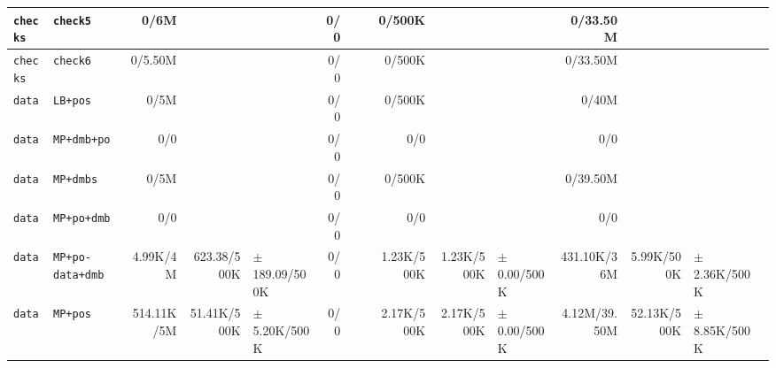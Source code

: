 \begin{tabular}{l l  | r r l | r r l | r r l | r r l l}
         \verb|checks| &                                              \verb|check5| &           0/6M &                       &                   &            0/0 &                       &  &         0/500K &                       &                   &       0/33.50M &                       &                   & \\ \hline 
         \verb|checks| &                                              \verb|check6| &        0/5.50M &                       &                   &            0/0 &                       &  &         0/500K &                       &                   &       0/33.50M &                       &                   & \\ \hline 
           \verb|data| &                                              \verb|LB+pos| &           0/5M &                       &                   &            0/0 &                       &  &         0/500K &                       &                   &          0/40M &                       &                   & \\ \hline 
           \verb|data| &                                           \verb|MP+dmb+po| &            0/0 &                       &                   &            0/0 &                       &  &            0/0 &                       &                   &            0/0 &                       &                   & \\ \hline 
           \verb|data| &                                             \verb|MP+dmbs| &           0/5M &                       &                   &            0/0 &                       &  &         0/500K &                       &                   &       0/39.50M &                       &                   & \\ \hline 
           \verb|data| &                                           \verb|MP+po+dmb| &            0/0 &                       &                   &            0/0 &                       &  &            0/0 &                       &                   &            0/0 &                       &                   & \\ \hline 
           \verb|data| &                                      \verb|MP+po-data+dmb| &       4.99K/4M &           623.38/500K & $\pm$ 189.09/500K &            0/0 &                       &  &     1.23K/500K &            1.23K/500K &   $\pm$ 0.00/500K &    431.10K/36M &            5.99K/500K &  $\pm$ 2.36K/500K & \\ \hline 
           \verb|data| &                                              \verb|MP+pos| &     514.11K/5M &           51.41K/500K &  $\pm$ 5.20K/500K &            0/0 &                       &  &     2.17K/500K &            2.17K/500K &   $\pm$ 0.00/500K &   4.12M/39.50M &           52.13K/500K &  $\pm$ 8.85K/500K & \\ \hline 

\end{tabular}
